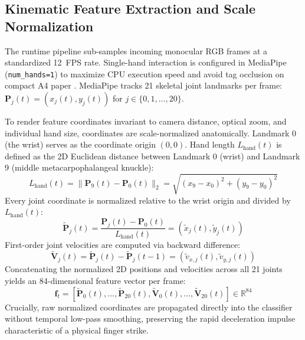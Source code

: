 \documentclass[conference]{IEEEtran}
\begin{document}
\subsection{Kinematic Feature Extraction and Scale Normalization}
The runtime pipeline sub-samples incoming monocular RGB frames at a standardized 12~FPS rate. Single-hand interaction is configured in MediaPipe (\texttt{num\_hands=1}) to maximize CPU execution speed and avoid tag occlusion on compact A4 paper \cite{Andriyanov2025Improving, SanchezBrizuela2023Lightweight}. MediaPipe tracks 21 skeletal joint landmarks per frame: $\mathbf{P}_j(t) = (x_j(t), y_j(t))$ for $j \in \{0, 1, \dots, 20\}$.

To render feature coordinates invariant to camera distance, optical zoom, and individual hand size, coordinates are scale-normalized anatomically. Landmark 0 (the wrist) serves as the coordinate origin $(0, 0)$. Hand length $L_{\text{hand}}(t)$ is defined as the 2D Euclidean distance between Landmark 0 (wrist) and Landmark 9 (middle metacarpophalangeal knuckle):
\begin{equation}
L_{\text{hand}}(t) = \|\mathbf{P}_9(t) - \mathbf{P}_0(t)\|_2 = \sqrt{(x_9 - x_0)^2 + (y_9 - y_0)^2}
\label{eq:hand_length}
\end{equation}
Every joint coordinate is normalized relative to the wrist origin and divided by $L_{\text{hand}}(t)$:
\begin{equation}
\tilde{\mathbf{P}}_j(t) = \frac{\mathbf{P}_j(t) - \mathbf{P}_0(t)}{L_{\text{hand}}(t)} = \left(\tilde{x}_j(t), \tilde{y}_j(t)\right)
\label{eq:normalized_pos}
\end{equation}
First-order joint velocities are computed via backward difference:
\begin{equation}
\tilde{\mathbf{V}}_j(t) = \tilde{\mathbf{P}}_j(t) - \tilde{\mathbf{P}}_j(t-1) = \left(\tilde{v}_{x,j}(t), \tilde{v}_{y,j}(t)\right)
\label{eq:joint_velocity}
\end{equation}
Concatenating the normalized 2D positions and velocities across all 21 joints yields an 84-dimensional feature vector per frame:
\begin{equation}
\mathbf{f}_t = \left[\tilde{\mathbf{P}}_0(t), \dots, \tilde{\mathbf{P}}_{20}(t), \tilde{\mathbf{V}}_0(t), \dots, \tilde{\mathbf{V}}_{20}(t)\right] \in \mathbb{R}^{84}
\label{eq:feature_vector}
\end{equation}
Crucially, raw normalized coordinates are propagated directly into the classifier without temporal low-pass smoothing, preserving the rapid deceleration impulse characteristic of a physical finger strike.
\end{document}
